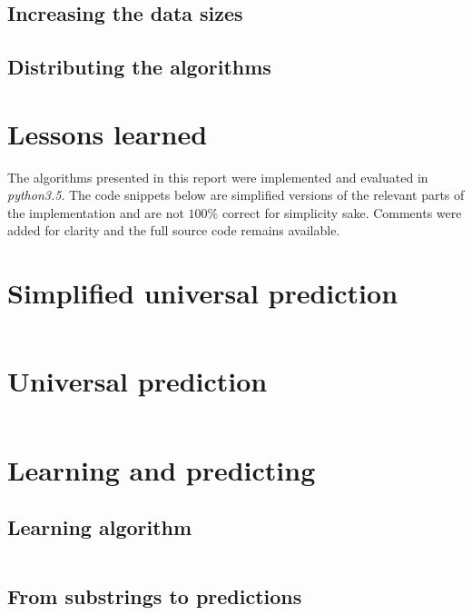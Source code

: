 \documentclass[a4paper,12pt]{article}
\begin{document}
  \subsection{Increasing the data sizes}

  \subsection{Distributing the algorithms}

\section*{Lessons learned}

  \lipsum[8-9]

\clearpage
\begin{appendices}

  The algorithms presented in this report were implemented and evaluated
  in \emph{python3.5}. The code snippets below are simplified versions of
  the relevant parts of the implementation and are not $100\%$ correct for
  simplicity sake. Comments were added for clarity and the full source code
  remains available.

  \section{Simplified universal prediction}

    \inputminted[linenos]{python}{code/simplified.py}

  \clearpage
  \section{Universal prediction}

    \inputminted[linenos]{python}{code/complete.py}

  \clearpage
  \section{Learning and predicting}

    \subsection{Learning algorithm}

      \inputminted[linenos]{python}{code/learning.py}

    \clearpage
    \subsection{From substrings to predictions}

      \inputminted[linenos]{python}{code/predicting.py}

\end{appendices}


 
\end{document}
